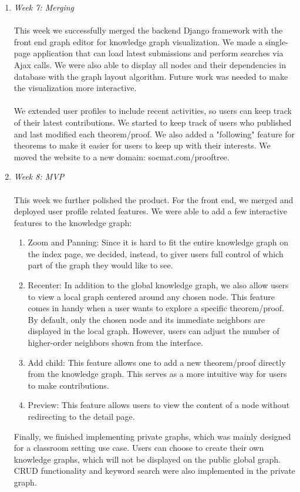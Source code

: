 \documentclass{acm_proc_article-sp}
\begin{document}
\begin{enumerate}
\item \emph{Week 7:  Merging}\\\\
This week we successfully merged the backend Django framework with the front end graph editor for knowledge graph visualization. We made a single-page application that can load latest submissions and perform searches via Ajax calls. We were also able to display all nodes and their dependencies in database with the graph layout algorithm. Future work was needed to make the visualization more interactive. \\\\
We extended user profiles to include recent activities, so users can keep track of their latest contributions. We started to keep track of users who published and last modified each theorem/proof. We also added a "following" feature for theorems to make it easier for users to keep up with their interests.  We moved the website to a new domain: socmat.com/prooftree.\\


\item \emph{Week 8: MVP}\\\\
This week we further polished the product. For the front end, we merged and deployed user profile related features. We were able to add a few interactive features to the knowledge graph:
\begin{enumerate}
\item Zoom and Panning: Since it is hard to fit the entire knowledge graph on the index page, we decided, instead, to giver users full control of which part of the graph they would like to see. 
\item Recenter: In addition to the global knowledge graph, we also allow users to view a local graph centered around any chosen node. This feature comes in handy when a user wants to explore a specific theorem/proof. By default, only the chosen node and its immediate neighbors are displayed in the local graph. However, users can adjust the number of higher-order neighbors shown from the interface.
\item Add child: This feature allows one to add a new theorem/proof directly from the knowledge graph. This serves as a more intuitive way for users to make contributions. 
\item Preview: This feature allows users to view the content of a node without redirecting to the detail page.
\end{enumerate}

Finally, we finished implementing private graphs, which was mainly designed for a classroom setting use case. Users can choose to create their own knowledge graphs, which will not be displayed on the public global graph. CRUD functionality and keyword search were also implemented in the private graph. 

\end{enumerate}
\end{document}
